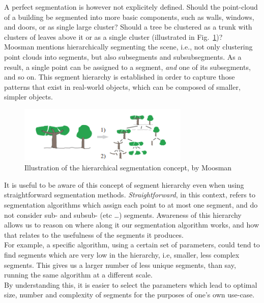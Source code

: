 A perfect segmentation is however not explicitely defined. Should the point-cloud of a building be segmented into more basic components, such as walls, windows, and doors, or as single large cluster? Should a tree be clustered as a trunk with clusters of leaves above it or as a single cluster (illustrated in Fig.~\ref{fig:hierarchical})?\\

Moosman \cite{moosmann2011unsupervised} mentions hierarchically segmenting the scene, i.e., not only clustering point clouds into segments, but also subsegments and subsubsegments. As a result, a single point can be assigned to a segment, \textit{and} one of its subsegments, and so on. This segment hierarchy is established in order to capture those patterns that exist in real-world objects, which can be composed of smaller, simpler objects.\\

\begin{figure}
  \centering
  \includegraphics[width=3.2in]{images/hierarchical.png}
  \caption{Illustration of the hierarchical segmentation concept, by Moosman \cite{moosmann2011unsupervised}}
  \label{fig:hierarchical}
\end{figure}

It is useful to be aware of this concept of segment hierarchy even when using straightforward segmentation methods. \textit{Straightforward}, in this context, refers to segmentation algorithms which assign each point to at most one segment, and do not consider sub- and subsub- (etc \ldots) segments. Awareness of this hierarchy allows us to reason on where along it our segmentation algorithm works, and how that relates to the usefulness of the segments it produces.\\

For example, a specific algorithm, using a certain set of parameters, could tend to find segments which are very low in the hierarchy, i.e, smaller, less complex segments. This gives us a larger number of less unique segments, than say, running the same algorithm at a different scale.\\

By understanding this, it is easier to select the parameters which lead to optimal size, number and complexity of segments for the purposes of one's own use-case.\\

